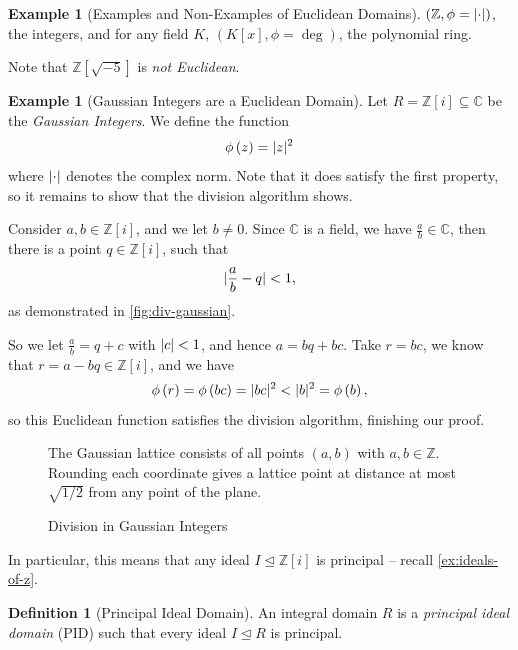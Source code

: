 \documentclass{article}
\theoremstyle{definition}
\newtheorem{definition}[theorem]{Definition}
\newtheorem{example}[theorem]{Example}
\newtheorem*{example*}{Example}
\theoremstyle{remark}
\DeclarePairedDelimiter{\abs}{\lvert}{\rvert}
\newcommand{\pqty}[1]{\left(#1\right)}
\newcommand{\bqty}[1]{\left[#1\right]}
\newcommand{\flatfrac}[2]{\frac{#1}{#2}}
\newcommand{\subring}{\subseteq}
\newcommand{\idealsub}{\trianglelefteq}
\newcommand{\ZZ}{\mathbb{Z}}
\newcommand{\CC}{\mathbb{C}}
\begin{document}
\begin{example*}[Examples and Non-Examples of Euclidean Domains]
    \(\pqty{\ZZ, \phi = \abs{ \cdot }}\), the integers, and for any field \(K\), \(\pqty{K\bqty{x}, \phi = \deg}\), the polynomial ring.

    Note that \(\ZZ\bqty{\sqrt{-5}}\) is \emph{not Euclidean}.
\end{example*}

\begin{example}[Gaussian Integers are a Euclidean Domain]
    \label{ex:gaussian-integers-euclidean-domain}%
    Let \(R = \ZZ\bqty{i} \subring \CC\) be the \emph{Gaussian Integers}. We define the function
    \[
        \phi\pqty{z} = \abs{z}^2
    \]
    where \(\abs{ \cdot }\) denotes the complex norm. Note that it does satisfy the first property, so it remains to show that the division algorithm shows.

    Consider \(a, b \in \ZZ\bqty{i}\), and we let \(b \neq 0\). Since \(\CC\) is a field, we have \(\flatfrac{a}{b} \in \CC\), then there is a point \(q \in \ZZ\bqty{i}\), such that
    \[
        \abs{\frac{a}{b} - q} < 1,
    \]
    as demonstrated in \autoref{fig:div-gaussian}.

    So we let \(\frac{a}{b} = q + c\) with \(\abs{c} < 1\), and hence \(a = bq + bc\). Take \(r = bc\), we know that \(r = a - bq \in \ZZ\bqty{i}\), and we have
    \[
        \phi\pqty{r} = \phi\pqty{bc} = \abs{bc}^2 < \abs{b}^2 = \phi\pqty{b},
    \]
    so this Euclidean function satisfies the division algorithm, finishing our proof.
\end{example}

\begin{figure}[ht!]
    \centering
    \par The Gaussian lattice consists of all points $(a,b)$ with $a,b\in\mathbb Z$. Rounding each coordinate gives a lattice point at distance at most $\sqrt{1/2}$ from any point of the plane.\par
    \caption{Division in Gaussian Integers}
    \label{fig:div-gaussian}
\end{figure}

In particular, this means that any ideal \(I \idealsub \ZZ\bqty{i}\) is principal -- recall \autoref{ex:ideals-of-z}.

\begin{definition}[Principal Ideal Domain]
    \label{def:pid}%
    An integral domain \(R\) is a \emph{principal ideal domain} (PID) such that every ideal \(I \idealsub R\) is principal.
\end{definition}
\end{document}
